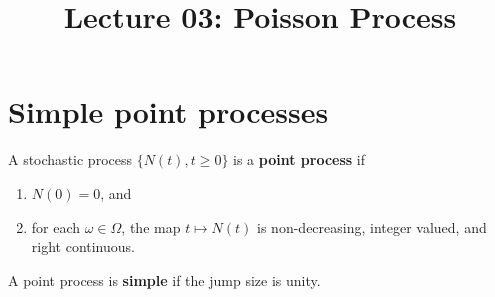 \documentclass[a4paper,10pt,english]{article}
\title{Lecture 03: Poisson Process}
\author{}
\begin{document}
\maketitle

\section{Simple point processes}
A stochastic process $\{N(t), t\geqslant 0\}$ is a \textbf{point process} if
\begin{enumerate}
  \item $N(0) = 0$, and 
  \item for each $\omega \in \Omega$, the map $t\mapsto N(t)$ is non-decreasing, integer valued, and right continuous.%
\end{enumerate}
A point process is \textbf{simple} if the jump size is unity.
\end{document}

